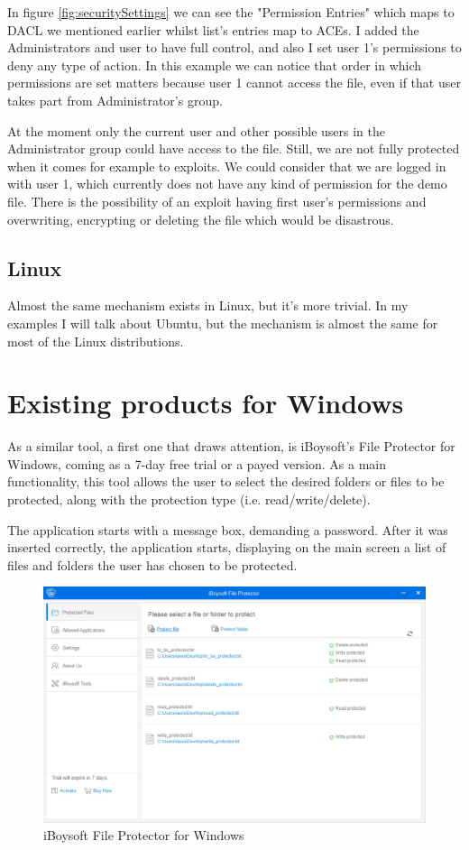 	In figure \ref{fig:securitySettings} we can see the "Permission Entries" which maps to DACL we mentioned earlier whilst list's entries map to ACEs. I added the Administrators and user to have full control, and also I set user 1's permissions to deny any type of action. In this example we can notice that order in which permissions are set matters because user 1 cannot access the file, even if that user takes part from Administrator's group. 
	
	At the moment only the current user and other possible users in the Administrator group could have access to the file. Still, we are not fully protected when it comes for example to exploits. We could consider that we are logged in with user 1, which currently does not have any kind of permission for the demo file. There is the possibility of an exploit having first user's permissions and overwriting, encrypting or deleting the file which would be disastrous.
	
	
	\subsection{Linux}
	Almost the same mechanism exists in Linux, but it's more trivial. In my examples I will talk about Ubuntu, but the mechanism is almost the same for most of the Linux distributions.
		
	\section{Existing products for Windows}
	As a similar tool, a first one that draws attention, is iBoysoft's File Protector for Windows, coming as a 7-day free trial or a payed version. As a main functionality, this tool allows the user to select the desired folders or files to be protected, along with the protection type (i.e. read/write/delete).
	
	The application starts with a message box, demanding a password. After it was inserted correctly, the application starts, displaying on the main screen a list of files and folders the user has chosen to be protected.
	
	\begin{figure}[h!]
		\includegraphics[width=\linewidth]{images/iBoysoftMain.jpg}
		\caption{iBoysoft File Protector for Windows}
		\label{fig:iBoysoftFP}
	\end{figure}
	

